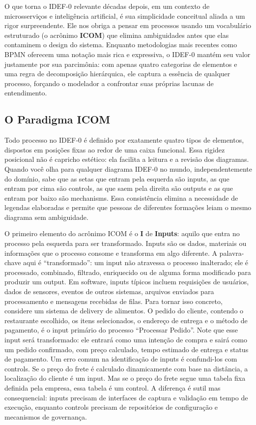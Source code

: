 O que torna o IDEF-0 relevante décadas depois, em um contexto de microsserviços e
inteligência artificial, é sua simplicidade conceitual aliada a um rigor
surpreendente. Ele nos obriga a pensar em processos usando um vocabulário
estruturado (o acrônimo \textbf{ICOM}) que elimina ambiguidades antes que
elas contaminem o design do sistema. Enquanto metodologias mais recentes como
BPMN oferecem uma notação mais rica e expressiva, o IDEF-0 mantém seu valor
justamente por sua parcimônia: com apenas quatro categorias de elementos e uma
regra de decomposição hierárquica, ele captura a essência de qualquer processo,
forçando o modelador a confrontar suas próprias lacunas de entendimento.

\subsection{O Paradigma ICOM}

Todo processo no IDEF-0 é definido por exatamente quatro tipos de elementos, dispostos
em posições fixas ao redor de uma caixa funcional. Essa rigidez posicional não é
capricho estético: ela facilita a leitura e a
revisão dos diagramas. Quando você olha para qualquer diagrama IDEF-0 no mundo,
independentemente do domínio, sabe que as setas que entram pela esquerda são inputs,
as que entram por cima são controls, as que saem pela direita são outputs e as que
entram por baixo são mechanisms. Essa consistência elimina a necessidade de legendas
elaboradas e permite que pessoas de diferentes formações leiam o mesmo diagrama sem
ambiguidade.

O primeiro elemento do acrônimo ICOM é o \textbf{I} de \textbf{Inputs}: aquilo
que entra no processo pela esquerda para ser transformado. Inputs são os dados,
materiais ou informações que o processo consome e transforma em algo diferente. A
palavra-chave aqui é ``transformado'': um input não atravessa o processo inalterado;
ele é processado, combinado, filtrado, enriquecido ou de alguma forma modificado
para produzir um output. Em software, inputs típicos incluem requisições de
usuários, dados de sensores, eventos de outros sistemas, arquivos enviados para
processamento e mensagens recebidas de filas. Para tornar isso concreto, considere
um sistema de delivery de alimentos. O pedido do cliente, contendo o restaurante
escolhido, os itens selecionados, o endereço de entrega e o método de pagamento,
é o input primário do processo ``Processar Pedido''. Note que esse input será
transformado: ele entrará como uma intenção de compra e sairá como um pedido
confirmado, com preço calculado, tempo estimado de entrega e status de pagamento.
Um erro comum na identificação de inputs é confundi-los com controls. Se o preço
do frete é calculado dinamicamente com base na distância, a localização do cliente
é um input. Mas se o preço do frete segue uma tabela fixa definida pela empresa,
essa tabela é um control. A diferença é sutil mas consequencial: inputs precisam de
interfaces de captura e validação em tempo de execução, enquanto controls precisam
de repositórios de configuração e mecanismos de governança.

